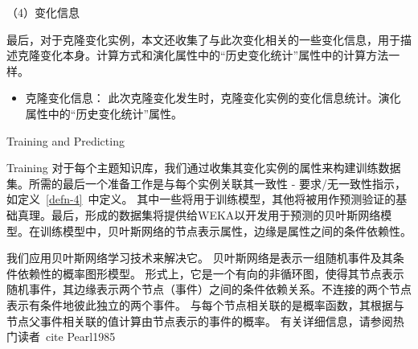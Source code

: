 （4）变化信息

最后，对于克隆变化实例，本文还收集了与此次变化相关的一些变化信息，用于描述克隆变化本身。计算方式和演化属性中的“历史变化统计”属性中的计算方法一样。

\begin {itemize}
\item
克隆变化信息：
此次克隆变化发生时，克隆变化实例的变化信息统计。演化属性中的“历史变化统计”属性。
\end {itemize}




{Training and Predicting} 


{Training} 
对于每个主题知识库，我们通过收集其变化实例的属性来构建训练数据集。所需的最后一个准备工作是与每个实例关联其一致性 - 要求/无一致性指示，如定义~\ref{defn-4}~中定义。 其中一些将用于训练模型，其他将被用作预测验证的基础真理。最后，形成的数据集将提供给WEKA以开发用于预测的贝叶斯网络模型。在训练模型中，贝叶斯网络的节点表示属性，边缘是属性之间的条件依赖性。



我们应用贝叶斯网络学习技术来解决它。
贝叶斯网络是表示一组随机事件及其条件依赖性的概率图形模型。
形式上，它是一个有向的非循环图，使得其节点表示随机事件，其边缘表示两个节点（事件）之间的条件依赖关系。不连接的两个节点表示有条件地彼此独立的两个事件。
与每个节点相关联的是概率函数，其根据与节点父事件相关联的值计算由节点表示的事件的概率。
有关详细信息，请参阅热门读者\ cite {Pearl1985}




